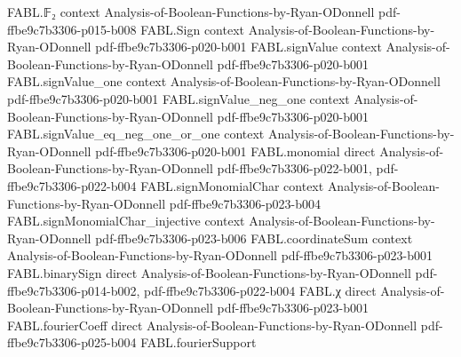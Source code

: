 \begin{theorem}
\label{FABL.exercise5_44}
\leanok
{}
\proofstep
  {FABL.𝔽₂}
  {context}
  {Analysis-of-Boolean-Functions-by-Ryan-ODonnell}
  {pdf-ffbe9c7b3306-p015-b008}
\proofstep
  {FABL.Sign}
  {context}
  {Analysis-of-Boolean-Functions-by-Ryan-ODonnell}
  {pdf-ffbe9c7b3306-p020-b001}
\proofstep
  {FABL.signValue}
  {context}
  {Analysis-of-Boolean-Functions-by-Ryan-ODonnell}
  {pdf-ffbe9c7b3306-p020-b001}
\proofstep
  {FABL.signValue_one}
  {context}
  {Analysis-of-Boolean-Functions-by-Ryan-ODonnell}
  {pdf-ffbe9c7b3306-p020-b001}
\proofstep
  {FABL.signValue_neg_one}
  {context}
  {Analysis-of-Boolean-Functions-by-Ryan-ODonnell}
  {pdf-ffbe9c7b3306-p020-b001}
\proofstep
  {FABL.signValue_eq_neg_one_or_one}
  {context}
  {Analysis-of-Boolean-Functions-by-Ryan-ODonnell}
  {pdf-ffbe9c7b3306-p020-b001}
\proofstep
  {FABL.monomial}
  {direct}
  {Analysis-of-Boolean-Functions-by-Ryan-ODonnell}
  {pdf-ffbe9c7b3306-p022-b001,
    pdf-ffbe9c7b3306-p022-b004}
\proofstep
  {FABL.signMonomialChar}
  {context}
  {Analysis-of-Boolean-Functions-by-Ryan-ODonnell}
  {pdf-ffbe9c7b3306-p023-b004}
\proofstep
  {FABL.signMonomialChar_injective}
  {context}
  {Analysis-of-Boolean-Functions-by-Ryan-ODonnell}
  {pdf-ffbe9c7b3306-p023-b006}
\proofstep
  {FABL.coordinateSum}
  {context}
  {Analysis-of-Boolean-Functions-by-Ryan-ODonnell}
  {pdf-ffbe9c7b3306-p023-b001}
\proofstep
  {FABL.binarySign}
  {direct}
  {Analysis-of-Boolean-Functions-by-Ryan-ODonnell}
  {pdf-ffbe9c7b3306-p014-b002,
    pdf-ffbe9c7b3306-p022-b004}
\proofstep
  {FABL.χ}
  {direct}
  {Analysis-of-Boolean-Functions-by-Ryan-ODonnell}
  {pdf-ffbe9c7b3306-p023-b001}
\proofstep
  {FABL.fourierCoeff}
  {direct}
  {Analysis-of-Boolean-Functions-by-Ryan-ODonnell}
  {pdf-ffbe9c7b3306-p025-b004}
\proofstep
  {FABL.fourierSupport}

\end{theorem}
